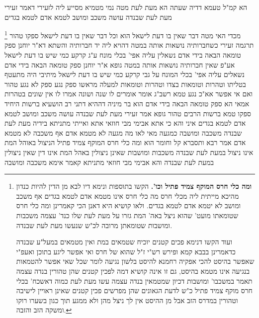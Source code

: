 \documentclass[12pt, openany]{book}
\newcommand{\footnotecomment}[1]{
	\renewcommand\thefootnote{}
	\footnote{#1}}
\newcommand{\commenta}[1]{\footnotecomment{#1}}
\begin{document}
{הא קמ"ל טעמא דדיה שעתה הא מעת לעת מטה נמי מטמיא מסייע ליה לזעירי דאמר זעירי מעת לעת שבנדה עושה משכב ומושב לטמא אדם לטמא בגדים 
\commenta{\textbf{ומה כלי חרס המוקף צמיד פתיל וכו'.} הקשו בתוספות ונימא דיו לבא מן הדין להיות כנדון מהיכא מייתית ליה מכלי חרס מה כלי חרס אינו מטמא אדם לטמא בגדים אף משכב ומושב לא יטמא אדם לטמא בגדים. ולאו קושיא היא דאנן הכי קאמרינן ומה כלי חרס שטומאתו מועט' שהוא ניצל באה' המת גזרו על מעת לעת שלו כנד' עצמה משכבות ומושבות שטומאתן מרובה לכ"ש שנעשו מעת לעת שבנדה.\par ועוד הקשו דנימא פכים קטנים יוכיח שטמאים במת ואין מטמאים במעל"ע שבנדה כדאמרינן בבבא קמא ופירש רש"י ז"ל שהוא של חרס ואי אפשר ליגע בתוכן ואעפ"י שאפשר בהיסט להכי אפקיה רחמנא להיסט בלשון נגיעה לומר שכל שאי אפשר להטמאות בנגיעה אינו מטמא בהיסט, גם זו אינה קושיא דמה לפכין קטנים שהן טהורין בנדה עצמה תאמר במשכבו' ומושבות דכיון שמטמאין בנדה עצמה עשו מעת לעת כמוה דאשכח' בכלי חרס מוקף צמיד פתיל כ"ש לדעת הגאונים שהן מפרשים פכין קטנים שאינן ראויין לישיבה וטהורין במדרס הזב אבל מן ההיסט אין לך ניצל מהן ולא ממגע תוך כגון בשערו רוקו ומשקה הזב והזבה. }
מכדי האי מטה דבר שאין בו דעת לישאל הוא וכל דבר שאין בו דעת לישאל ספקו טהור תרגמה זעירי כשחברותיה נושאות אותה במטה דהויא ליה יד חברותיה 
והשתא דא"ר יוחנן ספק טומאה הבאה בידי אדם נשאלין עליה אפי' בכלי מונח ע"ג קרקע כמי שיש בו דעת לישאל אע"פ שאין חברותיה נושאות אותה במטה 
גופא א"ר יוחנן ספק טומאה הבאה בידי אדם נשאלים עליה אפי' בכלי המונח על גבי קרקע כמי שיש בו דעת לישאל 
מיתיבי היה מתעטף בטליתו וטהרות וטומאות בצדו וטהרות וטומאות למעלה מראשו ספק נגע ספק לא נגע טהור ואם אי אפשר אא"כ נגע טמא 
רשב"ג אומר אומרים לו שנה ושונה אמרו לו אין שונים בטהרות
אמאי הא ספק טומאה הבאה בידי אדם הוא 
בר מיניה דההיא דתני רב הושעיא  ברשות היחיד ספקו טמא ברשות הרבים טהור 
גופא אמר זעירי מעת לעת שבנדה עושה משכב ומושב לטמא אדם לטמא בגדים 
איני והא כי אתא אבימי מבי חוזאי אתא ואייתי מתניתא בידיה מעת לעת שבנדה משכבה ומושבה כמגעה מאי לאו מה מגעה לא מטמא אדם אף משכבה לא מטמא אדם 
אמר רבא ותסברא קל וחומר הוא ומה כלי חרס המוקף צמיד פתיל הניצול באוהל המת אינו ניצול במעת לעת שבנדה משכבות ומושבות שאינן ניצולין באהל המת אינו דין שאין ניצולין במעת לעת שבנדה 
והא אבימי מבי חוזאי מתניתא קאמר אימא משכבה ומושבה}
\end{document}
